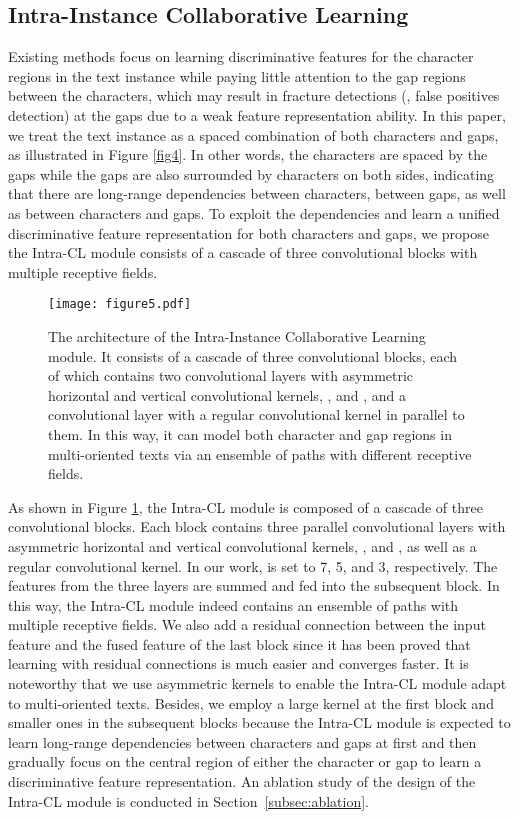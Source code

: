 \subsection{Intra-Instance Collaborative Learning}
\label{subsec:intraCL}
Existing methods focus on learning discriminative features for the character regions in the text instance while paying little attention to the gap regions between the characters, which may result in fracture detections (, false positives detection) at the gaps due to a weak feature representation ability. In this paper, we treat the text instance as a spaced combination of both characters and gaps, as illustrated in Figure \ref{fig4}. In other words, the characters are spaced by the gaps while the gaps are also surrounded by characters on both sides, indicating that there are long-range dependencies between characters, between gaps, as well as between characters and gaps. To exploit the dependencies and learn a unified discriminative feature representation for both characters and gaps, we propose the Intra-CL module consists of a cascade of three convolutional blocks with multiple receptive fields.


\begin{figure}[t]
  \centering
  \texttt{[image: figure5.pdf]}
  \caption{The architecture of the Intra-Instance Collaborative Learning module. It consists of a cascade of three convolutional blocks, each of which contains two convolutional layers with asymmetric horizontal and vertical convolutional kernels, ,   and , and a convolutional layer with a regular  convolutional kernel in parallel to them. In this way, it can model both character and gap regions in multi-oriented texts via an ensemble of paths with different receptive fields.}
  \label{fig5}
\end{figure}


As shown in Figure \ref{fig5}, the Intra-CL module is composed of a cascade of three convolutional blocks. Each block contains three parallel convolutional layers with asymmetric horizontal and vertical convolutional kernels, ,   and , as well as a regular  convolutional kernel. In our work,  is set to 7, 5, and 3, respectively. The features from the three layers are summed and fed into the subsequent block. In this way, the Intra-CL module indeed contains an ensemble of paths with multiple receptive fields. We also add a residual connection between the input feature and the fused feature of the last block since it has been proved that learning with residual connections is much easier and converges faster. It is noteworthy that we use asymmetric kernels to enable the Intra-CL module adapt to multi-oriented texts. Besides, we employ a large kernel at the first block and smaller ones in the subsequent blocks because the Intra-CL module is expected to learn long-range dependencies between characters and gaps at first and then gradually focus on the central region of either the character or gap to learn a discriminative feature representation. An ablation study of the design of the Intra-CL module is conducted in Section~\ref{subsec:ablation}.

